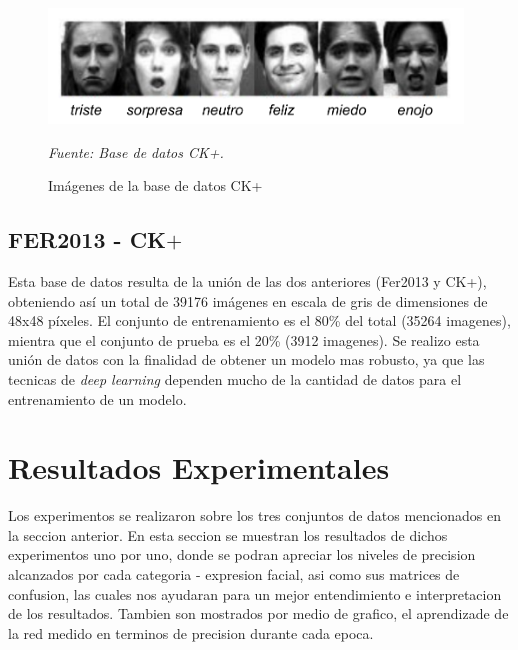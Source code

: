 \begin{figure}[H]
		\centering
		\includegraphics[width=110mm]{Imagenes/imagenes_ck+.pdf}
		\caption{Imágenes de la base de datos CK+}
		\vspace{0.15cm}
		\textit{Fuente: Base de datos CK+.}
		\label{fig:imagenes_ck+}
\end{figure}


\subsection{FER2013 - CK$+$}
\label{subsec:ck+fer2013}
Esta base de datos resulta de la unión de las dos anteriores (Fer2013 y CK+), obteniendo así un total de 39176 imágenes en escala de gris de dimensiones de 48x48 píxeles. El conjunto de entrenamiento es el 80\% del total (35264 imagenes), mientra que el conjunto de prueba es el 20\% (3912 imagenes). Se realizo esta unión de datos con la finalidad de obtener un modelo mas robusto, ya que las tecnicas de \textit{deep learning} dependen mucho de la cantidad de datos para el entrenamiento de un modelo.

\section{Resultados Experimentales}
\label{sec:experiment}

Los experimentos se realizaron sobre los tres conjuntos de datos mencionados en la seccion anterior. En esta seccion se muestran los resultados de dichos experimentos uno por uno, donde se podran apreciar los niveles de precision alcanzados por cada categoria - expresion facial, asi como sus matrices de confusion, las cuales nos ayudaran para un mejor entendimiento e interpretacion de los resultados. Tambien son mostrados por medio de grafico, el aprendizade de la red medido en terminos de precision durante cada epoca.

